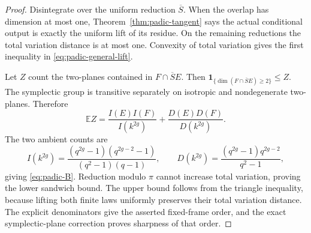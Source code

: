 \begin{proof}
Disintegrate over the uniform reduction $\overline S$. When the
overlap has dimension at most one, Theorem~\ref{thm:padic-tangent}
says the actual conditional output is exactly the uniform lift of
its residue. On the remaining reductions the total variation
distance is at most one. Convexity of total variation gives the
first inequality in \eqref{eq:padic-general-lift}.

Let $Z$ count the two-planes contained in $F\cap\overline S E$.
Then $\mathbf1_{\{\dim(F\cap\overline SE)\geq2\}}\leq Z$.
The symplectic group is transitive separately on isotropic and
nondegenerate two-planes. Therefore
\[
 \mathbb E Z
 =\frac{I(E)I(F)}{I(k^{2g})}
 +\frac{D(E)D(F)}{D(k^{2g})}.
\]
The two ambient counts are
\[
 I(k^{2g})=\frac{(q^{2g}-1)(q^{2g-2}-1)}{(q^2-1)(q-1)},
 \qquad
 D(k^{2g})=\frac{(q^{2g}-1)q^{2g-2}}{q^2-1},
\]
giving \eqref{eq:padic-B}. Reduction modulo $\pi$ cannot increase
total variation, proving the lower sandwich bound. The upper bound
follows from the triangle inequality, because lifting both finite
laws uniformly preserves their total variation distance. The
explicit denominators give the asserted fixed-frame order, and the
exact symplectic-plane correction proves sharpness of that order.
\end{proof}
